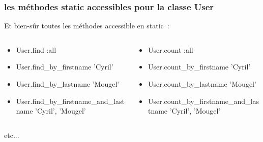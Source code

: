 \documentclass{beamer}
\begin{document}
\begin{frame}
    \frametitle{les méthodes static accessibles pour la classe User}
    Et bien-sûr toutes les méthodes accessible en static~:
    \tiny{}
    \begin{columns}
        \begin{column}[l]{6cm}
            \begin{itemize}
                \item User.find :all
                \item User.find\_by\_firstname 'Cyril'
                \item User.find\_by\_lastname 'Mougel'
                \item User.find\_by\_firstname\_and\_lastname 'Cyril', 'Mougel'
            \end{itemize}
        \end{column}

        \begin{column}[r]{6cm}
            \begin{itemize}
                \item User.count :all
                \item User.count\_by\_firstname 'Cyril'
                \item User.count\_by\_lastname 'Mougel'
                \item User.count\_by\_firstname\_and\_lastname 'Cyril', 'Mougel'
            \end{itemize}
        \end{column}
    \end{columns}
    \normalsize{}
    etc...
\end{frame}
\end{document}

